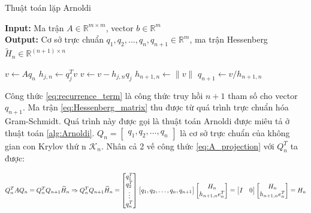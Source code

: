 \documentclass[14pt, a4paper]{article}
\numberwithin{equation}{section}
\numberwithin{algorithm}{section}
\numberwithin{figure}{section}
\numberwithin{dl}{section}
\numberwithin{md}{section}
\numberwithin{bd}{section}
\numberwithin{dn}{section}
\numberwithin{hq}{section}
\begin{document}
\begin{algorithm}[h!]
    \caption{Thuật toán lặp Arnoldi}\label{alg:Arnoldi}
    \hspace*{\algorithmicindent} \textbf{Input:} {Ma trận $A \in \mathbb{R}^{m \times m}$, vector $b \in \mathbb{R}^m$} \\
    \hspace*{\algorithmicindent} \textbf{Output:} {Cơ sở trực chuẩn $q_1, q_2, \dots, q_n, q_{n+1} \in \mathbb{R}^m$, ma trận Hessenberg $\widetilde{H}_n \in \mathbb{R}^{(n+1) \times n}$}
    \begin{algorithmic}
            \State $v \leftarrow Aq_n$
                \State $h_{j,n} \leftarrow q_j^T v$
                \State $v \leftarrow v - h_{j,n}q_j$
            \EndFor
            \State $h_{n+1,n} \leftarrow \lVert v \rVert$
            \State $q_{n+1} \leftarrow v/h_{n+1,n}$
        \EndFor
    \end{algorithmic}
\end{algorithm}

Công thức \ref{eq:recurrence_term} là công thức truy hồi $n+1$ tham số cho vector $q_{n+1}$. Ma trận \ref{eq:Hessenberg_matrix} thu được từ quá trình trực chuẩn hóa Gram-Schmidt. Quá trình này được gọi là thuật toán Arnoldi được miêu tả ở thuật toán \ref{alg:Arnoldi}. $Q_n=\begin{bmatrix} q_1, q_2, \dots, q_n \end{bmatrix}$ là cơ sở trực chuẩn của không gian con Krylov thứ n $\mathcal{K}_n$.
Nhân cả 2 vế công thức \ref{eq:A_projection} với $Q_n^T$ ta được:

\begin{equation}
    Q_n^TAQ_n=Q_n^TQ_{n+1}\widetilde{H}_n \\
    \Rightarrow Q_n^TQ_{n+1}\widetilde{H}_n = \begin{bmatrix}
        q_1^T \\ q_2^T \\ \vdots \\ q_n^T
    \end{bmatrix} \begin{bmatrix} q_1, q_2, \dots, q_n, q_{n+1} \end{bmatrix}
    \begin{bmatrix} H_n \\ h_{n+1,n}e_n^T \end{bmatrix}=\begin{bmatrix} I & 0 \end{bmatrix} \begin{bmatrix} H_n \\ h_{n+1,n}e_n^T \end{bmatrix}=H_n
\end{equation}
\end{document}

